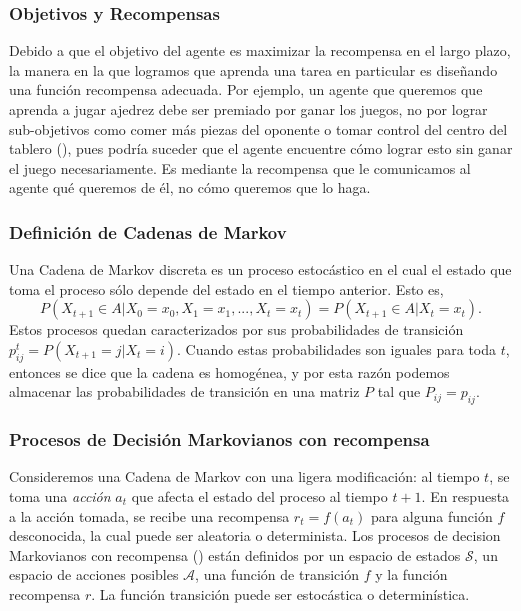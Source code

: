 \documentclass[11pt]{article}
\theoremstyle{plain}
\begin{document}
\subsubsection{Objetivos y Recompensas}
Debido a que el objetivo del agente es maximizar la recompensa en el largo plazo, la manera en la que logramos que aprenda una tarea en particular es diseñando una función recompensa adecuada. Por ejemplo, un agente que queremos que aprenda a jugar ajedrez debe ser premiado por ganar los juegos, no por lograr sub-objetivos como comer más piezas del oponente o tomar control del centro del tablero (\cite{sutton1998reinforcement}), pues podría suceder que el agente encuentre cómo lograr esto sin ganar el juego necesariamente. Es mediante la recompensa que le comunicamos al agente qué queremos de él, no cómo queremos que lo haga.
\subsubsection{Definición de Cadenas de Markov}
Una Cadena de Markov discreta es un proceso estocástico en el cual el estado que toma el proceso sólo depende del estado en el tiempo anterior. Esto es, 
\[P(X_{t+1} \in A | X_0=x_0, X_1=x_1 , ... , X_t=x_t) = P(X_{t+1} \in A | X_t = x_t).\]
Estos procesos quedan caracterizados por sus probabilidades de transición $p^t_{ij}=P(X_{t+1}=j | X_{t}=i)$. Cuando estas probabilidades son iguales para toda $t$, entonces se dice que la cadena es homogénea, y por esta razón podemos almacenar las probabilidades de transición en una matriz $P$ tal que $P_{ij}=p_{ij}$.
\subsubsection{Procesos de Decisión Markovianos con recompensa}
Consideremos una Cadena de Markov con una ligera modificación: al tiempo $t$, se toma una \textit{acción} $a_t$ que afecta el estado del proceso al tiempo $t+1$. En respuesta a la acción tomada, se recibe una recompensa $r_t = f(a_t)$ para alguna función $f$ desconocida, la cual puede ser aleatoria o determinista.
Los procesos de decision Markovianos con recompensa (\cite{Puterman:1994:MDP:528623}) están definidos por un espacio de estados $\mathcal{S}$, un espacio de acciones posibles $\mathcal{A}$, una función de transición $f$ y la función recompensa $r$. La función transición puede ser estocástica o determinística. 
\end{document}
